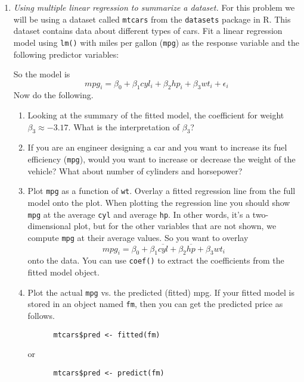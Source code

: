 \begin{enumerate}
\item \emph{Using multiple linear regression to summarize a dataset.}
  For this problem we will be using a dataset called \texttt{mtcars}
  from the \texttt{datasets} package in R. This dataset contains data
  about different types of cars.  Fit a linear regression model using
  \texttt{lm()} with miles per gallon (\texttt{mpg}) as the response
  variable and the following predictor variables:
    So the model is
    \[ mpg_i = \beta_0 + \beta_1 cyl_i + \beta_2 hp_i +
      \beta_3 wt_i + \epsilon_i \]
    Now do the following.
    \begin{enumerate}
    \item Looking at the summary of the fitted model, the coefficient for weight 
      $\beta_3 \approx -3.17$. What is the interpretation of $\beta_3$?
      
    \item If you are an engineer designing a car and you want to
      increase its fuel efficiency (\texttt{mpg}), would you want to
      increase or decrease the weight of the vehicle? What about
      number of cylinders and horsepower?
     
    \item Plot \texttt{mpg} as a function of
    \texttt{wt}. Overlay a fitted regression line from the
    full model onto the plot.  When plotting the regression line you
    should show \texttt{mpg} at the average \texttt{cyl} and average \texttt{hp}.
    In other words, it's a two-dimensional plot, but for the other
    variables that are not shown, we compute \texttt{mpg} at their
    average values. So you want to overlay
    \[ mpg_i = \beta_0 + \beta_1 \overline{cyl} +
      \beta_2 \overline{hp} +
      \beta_3 wt_i \]
    onto the data. You can use \texttt{coef()} to extract the
    coefficients from the fitted model object.

  \item Plot the actual \texttt{mpg} vs. the predicted (fitted)
    mpg. If your fitted model is stored in an object named
    \texttt{fm}, then you can get the predicted price as follows.
    \begin{Verbatim}
      mtcars$pred <- fitted(fm)
    \end{Verbatim}
    or
    \begin{Verbatim}
      mtcars$pred <- predict(fm)
    \end{Verbatim}


\end{enumerate}
\end{enumerate}
